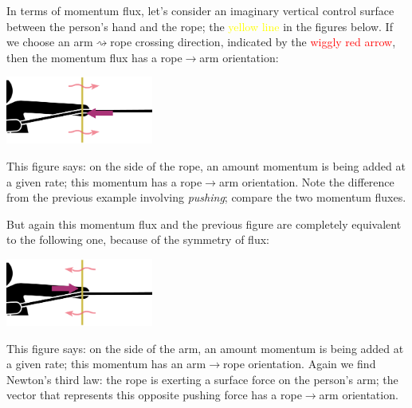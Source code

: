 \documentclass[a4paper,12pt,%
onecolumn,oneside,%
british%
]{memoir}
\renewcommand*{\|}[1][]{\nonscript\:#1\vert\nonscript\:\mathopen{}}
\begin{document}
In terms of momentum flux, let's consider an imaginary vertical control surface between the person's hand and the rope; the \textcolor{yellow}{yellow line} in the figures below. If we choose an arm$\rightsquigarrow$rope crossing direction, indicated by the \textcolor{red}{wiggly red arrow}, then the momentum flux has a rope$\rightarrow$arm orientation:\noprelistbreak
\begin{center}
  \includegraphics[height=6em]{images/person_pull_flux_right.pdf}
\end{center}
This figure says: on the side of the rope, an amount momentum is being added at a given rate; this momentum has a rope$\rightarrow$arm orientation. Note the difference from the previous example involving \emph{pushing}; compare the two momentum fluxes.

But again this momentum flux and the previous figure are completely equivalent to the following one, because of the symmetry of flux:\noprelistbreak
\begin{center}
  \includegraphics[height=6em]{images/person_pull_flux_left.pdf}
\end{center}
This figure says: on the side of the arm, an amount momentum is being added at a given rate; this momentum has an arm$\rightarrow$rope orientation. Again we find Newton's third law: the rope is exerting a surface force on the person's arm; the vector that represents this opposite pushing force has a rope$\to$arm orientation.

\medskip
\end{document}
